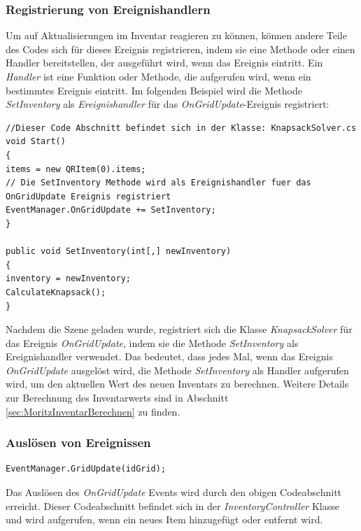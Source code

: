 \subsubsection*{Registrierung von Ereignishandlern}
Um auf Aktualisierungen im Inventar reagieren zu können, können andere Teile des Codes sich für dieses Ereignis registrieren, indem sie eine Methode oder einen Handler bereitstellen, der ausgeführt wird, wenn das Ereignis eintritt. Ein \textit{Handler} ist eine Funktion oder Methode, die aufgerufen wird, wenn ein bestimmtes Ereignis eintritt. Im folgenden Beispiel wird die Methode \textit{SetInventory} als \textit{Ereignishandler} für das \textit{OnGridUpdate}-Ereignis registriert:

\begin{lstlisting}[style=csharp label=code:Event Registration]
//Dieser Code Abschnitt befindet sich in der Klasse: KnapsackSolver.cs
void Start()
{
items = new QRItem(0).items;
// Die SetInventory Methode wird als Ereignishandler fuer das OnGridUpdate Ereignis registriert
EventManager.OnGridUpdate += SetInventory;
}

public void SetInventory(int[,] newInventory)
{
inventory = newInventory;
CalculateKnapsack();
}
\end{lstlisting}

Nachdem die Szene geladen wurde, registriert sich die Klasse \textit{KnapsackSolver} für das Ereignis \textit{OnGridUpdate}, indem sie die Methode \textit{SetInventory} als Ereignishandler verwendet. Das bedeutet, dass jedes Mal, wenn das Ereignis \textit{OnGridUpdate} ausgelöst wird, die Methode \textit{SetInventory} als Handler aufgerufen wird, um den aktuellen Wert des neuen Inventars zu berechnen. Weitere Details zur Berechnung des Inventarwerts sind in Abschnitt \ref{sec:MoritzInventarBerechnen} zu finden.

\subsubsection*{Auslösen von Ereignissen}

\begin{lstlisting}[style=csharp label=code:Event Trigger]
EventManager.GridUpdate(idGrid);
\end{lstlisting}

Das Auslösen des \textit{OnGridUpdate} Events wird durch den obigen Codeabschnitt erreicht. Dieser Codeabschnitt befindet
sich in der \textit{InventoryController} Klasse und wird aufgerufen, wenn ein neues Item hinzugefügt oder entfernt wird.


